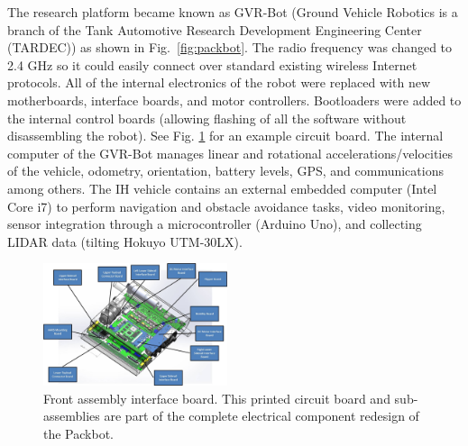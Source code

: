 The research platform became known as GVR-Bot (Ground Vehicle Robotics is a branch of the Tank Automotive Research Development Engineering Center (TARDEC)) as shown in Fig.~\ref{fig:packbot}. The radio frequency was changed to 2.4 GHz so it could easily connect over standard existing wireless Internet protocols. All of the internal electronics of the robot were replaced with new motherboards, interface boards, and motor controllers. Bootloaders were added to the internal control boards (allowing flashing of all the software without disassembling the robot). See Fig. \ref{fig:pcb} for an example circuit board. The internal computer of the GVR-Bot manages linear and rotational accelerations/velocities of the vehicle, odometry, orientation, battery levels, GPS, and communications among others. The IH vehicle contains an external embedded computer (Intel Core i7) to perform navigation and obstacle avoidance tasks, video monitoring, sensor integration through a microcontroller (Arduino Uno), and collecting LIDAR data (tilting Hokuyo UTM-30LX).   

\begin{figure}[b]
	\centering
	\includegraphics[width=0.48\textwidth]{./pictures/pcb.jpg}
	\caption{Front assembly interface board. This printed circuit board and sub-assemblies are part of the complete electrical component redesign of the Packbot.}
	\label{fig:pcb}
\end{figure}

